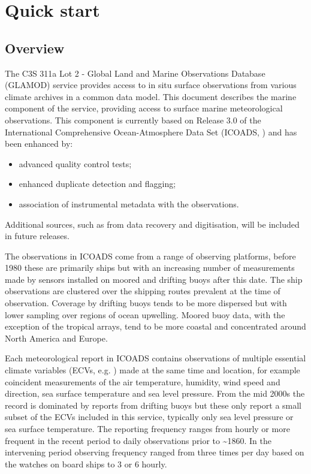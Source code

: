 \section{Quick start}
\subsection{Overview}
The C3S 311a Lot 2 - Global Land and Marine Observations Database (GLAMOD) service provides access to in situ surface observations from various climate archives in a common data model.
This document describes the marine component of the service, providing access to surface marine meteorological observations.
This component is currently based on Release 3.0 of the International Comprehensive Ocean-Atmosphere Data Set (ICOADS, \cite{Freeman2017}) and has been enhanced by: 
\begin{itemize}
\item advanced quality control tests; 
\item enhanced duplicate detection and flagging; 
\item association of instrumental metadata with the observations. 
\end{itemize}
Additional sources, such as from data recovery and digitisation, will be included in future releases.

The observations in ICOADS come from a range of observing platforms, before 1980 these are primarily ships but with an increasing number of measurements made by sensors installed on moored and drifting buoys after this date. 
The ship observations are clustered over the shipping routes prevalent at the time of observation. 
Coverage by drifting buoys tends to be more dispersed but with lower sampling over regions of ocean upwelling. 
Moored buoy data, with the exception of the tropical arrays, tend to be more coastal and concentrated around North America and Europe.

Each meteorological report in ICOADS contains observations of multiple essential climate variables (ECVs, e.g. \cite{Bojinski2014}) made at the same time and location, for example coincident measurements of the air temperature, humidity, wind speed and direction, sea surface temperature and sea level pressure.
From the mid 2000s the record is dominated by reports from drifting buoys but these only report a small subset of the ECVs included in this service, typically only sea level pressure or sea surface temperature. 
The reporting frequency ranges from hourly or more frequent in the recent period to daily observations prior to \sim 1860. 
In the intervening period observing frequency ranged from three times per day based on the watches on board ships to 3 or 6 hourly.


